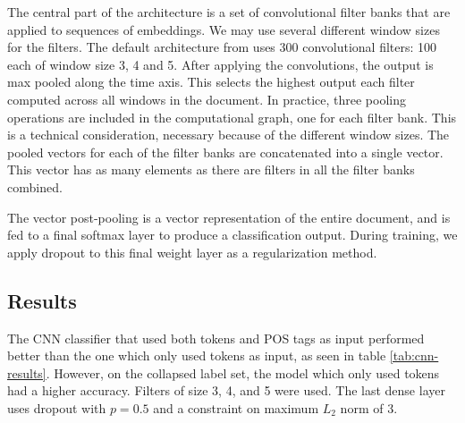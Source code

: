 The central part of the architecture is a set of convolutional filter banks
that are applied to sequences of embeddings. We may use several different
window sizes for the filters. The default architecture from
\textcite{kim2014convolutional} uses 300 convolutional filters: 100 each of
window size 3, 4 and 5. After applying the convolutions, the output is max
pooled along the time axis. This selects the highest output each filter
computed across all windows in the document. In practice, three pooling
operations are included in the computational graph, one for each filter bank.
This is a technical consideration, necessary because of the different window
sizes. The pooled vectors for each of the filter banks are concatenated into
a single vector. This vector has as many elements as there are filters in all
the filter banks combined.

The vector post-pooling is a vector representation of the entire document,
and is fed to a final softmax layer to produce a classification output.
During training, we apply dropout to this final weight layer as a
regularization method.


\subsection{Results}

The \ac{CNN} classifier that used both tokens and POS tags as input performed
better than the one which only used tokens as input, as seen in table
\ref{tab:cnn-results}. However, on the collapsed label set, the model which
only used tokens had a higher accuracy. Filters of size 3, 4, and 5 were
used. The last dense layer uses dropout with $p=0.5$ and a constraint on
maximum $L_2$ norm of 3.

